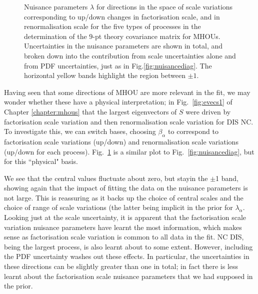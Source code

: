   \begin{figure}[h!]
    \begin{center}
    \end{center}
  \vspace{-0.55cm}
  \caption{Nuisance parameters $\lambda$ for directions in the space of scale variations corresponding to up/down changes in factorisation scale, and in renormalisation scale for the five types of processes in the determination of the $9$-pt theory covariance matrix for MHOUs. Uncertainties in the nuisance parameters are shown in total, and broken down into the contribution from scale uncertainties alone and from PDF uncertainties, just as in Fig.\ref{fig:nuisancediag}. The horizontal yellow bands highlight the region between $\pm 1$.}
  \label{fig:nuisancephys}
\end{figure}
Having seen that some directions of MHOU are more relevant in the fit, we may wonder whether these have a physical interpretation; in Fig.~\ref{fig:evecs1} of Chapter \ref{chapter:mhous} that the largest eigenvectors of $S$ were driven by factorisation scale variation and then renormalisation scale variation for DIS NC. To investigate this, we can switch bases, choosing $\beta_\alpha$ to correspond to factorisation scale variations (up/down) and renormalisation scale variations (up/down for each process). Fig.~\ref{fig:nuisancephys} is a similar plot to Fig.~\ref{fig:nuisancediag}, but for this ``physical" basis. 

We see that the central values fluctuate about zero, but stayin the $\pm$1 band, showing again that the impact of fitting the data on the nuisance parameters is not large. This is reassuring as it backs up the choice of central scales and the choice of range of scale variations (the latter being implicit in the prior for $\lambda_\alpha$. Looking just at the scale uncertainty, it is apparent that the factorisation scale variation nuisance parameters have learnt the most information, which makes sense as factorisation scale variation is common to all data in the fit. NC DIS, being the largest process, is also learnt about to some extent. However, including the PDF uncertainty washes out these effects. In particular, the uncertainties in these directions can be slightly greater than one in total; in fact there is less learnt about the factorisation scale nuisance parameters that we had supposed in the prior.

